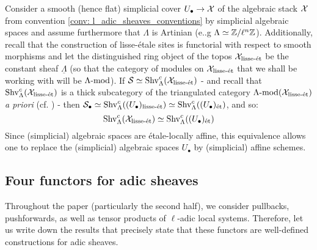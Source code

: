         \begin{example} \label{example: gluing_constructible_sheaves}
            Consider a smooth (hence flat) simplicial cover $U_{\bullet} \to \calX$ of the algebraic stack $\calX$ from convention \ref{conv: l_adic_sheaves_conventions} by simplicial algebraic spaces and assume furthermore that $\Lambda$ is Artinian (e..g $\Lambda \cong \Z/\ell^n\Z$). Additionally, recall that the construction of lisse-\'etale sites is functorial with respect to smooth morphisms and let the distinguished ring object of the topos $\calX_{\lisse\-\et}$ be the constant sheaf $\underline{\Lambda}$ (so that the category of modules on $\calX_{\lisse\-\et}$ that we shall be working with will be $\Lambda\mod$). If $\S \cong \Shv_{\Lambda}^c(\calX_{\lisse\-\et})$ - and recall that $\Shv_{\Lambda}^c(\calX_{\lisse\-\et})$ is a thick subcategory of the triangulated category $\Lambda\mod(\calX_{\lisse\-\et})$ \textit{a priori} (cf. \cite[\href{https://stacks.math.columbia.edu/tag/03RZ}{Tag 03RZ}]{stacks}) - then $\S_{\bullet} \cong \Shv_{\Lambda}^c((U_{\bullet})_{\lisse\-\et}) \cong \Shv_{\Lambda}^c((U_{\bullet})_{\et})$, and so:
                $$\Shv_{\Lambda}^c(\calX_{\lisse\-\et}) \cong \Shv_{\Lambda}^c((U_{\bullet})_{\et})$$
            Since (simplicial) algebraic spaces are \'etale-locally affine, this equivalence allows one to replace the (simplicial) algebraic spaces $U_{\bullet}$ by (simplicial) affine schemes. 
        \end{example}
        
    \subsection{Four functors for adic sheaves}
        Throughout the paper (particularly the second half), we consider pullbacks, pushforwards, as well as tensor products of $\ell$-adic local systems. Therefore, let us write down the results that precisely state that these functors are well-defined constructions for adic sheaves. 
        
        